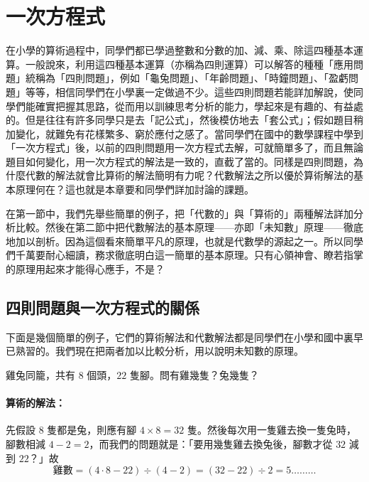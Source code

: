 
\section{一次方程式}\label{sec:ch4}

在小學的算術過程中，同學們都已學過整數和分數的加、減、乘、除這四種基本運算。一般說來，利用這四種基本運算（亦稱為四則運算）可以解答的種種「應用問題」統稱為「四則問題」，例如「龜兔問題」、「年齡問題」、「時鐘問題」、「盈虧問題」等等，相信同學們在小學裏一定做過不少。這些四則問題若能詳加解說，使同學們能確實把握其思路，從而用以訓練思考分析的能力，學起來是有趣的、有益處的。但是往往有許多同學只是去「記公式」，然後模仿地去「套公式」；假如題目稍加變化，就難免有花樣繁多、窮於應付之感了。當同學們在國中的數學課程中學到「一次方程式」後，以前的四則問題用一次方程式去解，可就簡單多了，而且無論題目如何變化，用一次方程式的解法是一致的，直截了當的。同樣是四則問題，為什麼代數的解法就會比算術的解法簡明有力呢？代數解法之所以優於算術解法的基本原理何在？這也就是本章要和同學們詳加討論的課題。

在第一節中，我們先舉些簡單的例子，把「代數的」與「算術的」兩種解法詳加分析比較。然後在第二節中把代數解法的基本原理——亦即「未知數」原理——徹底地加以剖析。因為這個看來簡單平凡的原理，也就是代數學的源起之一。所以同學們千萬要耐心細讀，務求徹底明白這一簡單的基本原理。只有心領神會、瞭若指掌的原理用起來才能得心應手，不是？

\subsection{四則問題與一次方程式的關係}\label{sec:4-1}

下面是幾個簡單的例子，它們的算術解法和代數解法都是同學們在小學和國中裏早已熟習的。我們現在把兩者加以比較分析，用以說明未知數的原理。

\begin{example}\label{ex:4-1-1}
雞兔同籠，共有 $8$ 個頭，$22$ 隻腳。問有雞幾隻？兔幾隻？
\end{example}

\paragraph{算術的解法：}
先假設 $8$ 隻都是兔，則應有腳 $4 \times 8 = 32$ 隻。然後每次用一隻雞去換一隻兔時，腳數相減 $4 - 2 = 2$，而我們的問題就是：「要用幾隻雞去換兔後，腳數才從 $32$ 減到 $22$？」故
\begin{equation}\label{eq:chicken_rabbit_arith}
  \text{雞數} = (4 \cdot 8 - 22) \div (4 - 2) = (32 - 22) \div 2 = 5 \dots\dots\dots
\end{equation}

